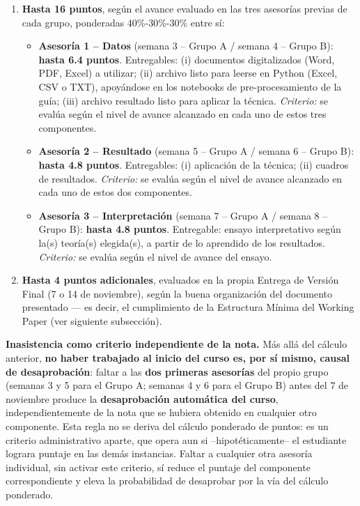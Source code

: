 \documentclass[11pt,a4paper]{article}
\begin{document}
\begin{enumerate}
    \item \textbf{Hasta 16 puntos}, según el avance evaluado en las tres asesorías previas de cada grupo, ponderadas 40\%-30\%-30\% entre sí:
    \begin{itemize}
        \item \textbf{Asesoría 1 -- Datos} (semana 3 -- Grupo A / semana 4 -- Grupo B): \textbf{hasta 6.4 puntos}. Entregables: (i) documentos digitalizados (Word, PDF, Excel) a utilizar; (ii) archivo listo para leerse en Python (Excel, CSV o TXT), apoyándose en los notebooks de pre-procesamiento de la guía; (iii) archivo resultado listo para aplicar la técnica. \textit{Criterio:} se evalúa según el nivel de avance alcanzado en cada uno de estos tres componentes.
        \item \textbf{Asesoría 2 -- Resultado} (semana 5 -- Grupo A / semana 6 -- Grupo B): \textbf{hasta 4.8 puntos}. Entregables: (i) aplicación de la técnica; (ii) cuadros de resultados. \textit{Criterio:} se evalúa según el nivel de avance alcanzado en cada uno de estos dos componentes.
        \item \textbf{Asesoría 3 -- Interpretación} (semana 7 -- Grupo A / semana 8 -- Grupo B): \textbf{hasta 4.8 puntos}. Entregable: ensayo interpretativo según la(s) teoría(s) elegida(s), a partir de lo aprendido de los resultados. \textit{Criterio:} se evalúa según el nivel de avance del ensayo.
    \end{itemize}
    \item \textbf{Hasta 4 puntos adicionales}, evaluados en la propia Entrega de Versión Final (7 o 14 de noviembre), según la buena organización del documento presentado --- es decir, el cumplimiento de la Estructura Mínima del Working Paper (ver siguiente subsección).
\end{enumerate}

\noindent
\textbf{Inasistencia como criterio independiente de la nota.} Más allá del cálculo anterior, \textbf{no haber trabajado al inicio del curso es, por sí mismo, causal de desaprobación}: faltar a las \textbf{dos primeras asesorías} del propio grupo (semanas 3 y 5 para el Grupo A; semanas 4 y 6 para el Grupo B) antes del 7 de noviembre produce la \textbf{desaprobación automática del curso}, independientemente de la nota que se hubiera obtenido en cualquier otro componente. Esta regla no se deriva del cálculo ponderado de puntos: es un criterio administrativo aparte, que opera aun si --hipotéticamente-- el estudiante lograra puntaje en las demás instancias. Faltar a cualquier otra asesoría individual, sin activar este criterio, sí reduce el puntaje del componente correspondiente y eleva la probabilidad de desaprobar por la vía del cálculo ponderado.
\end{document}
